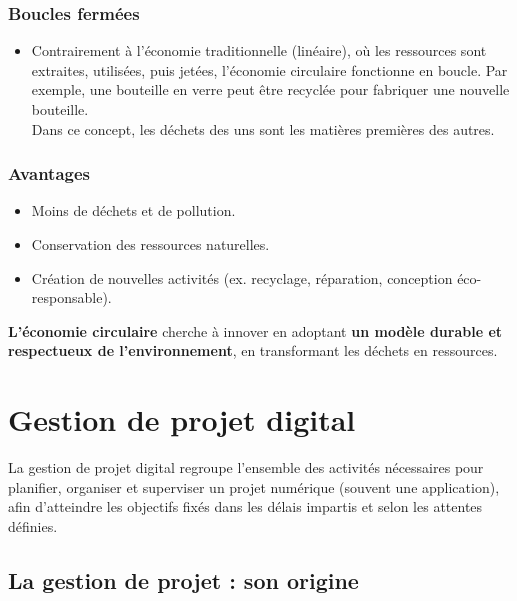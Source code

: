 \documentclass[
  letterpaper,
  DIV=11,
  numbers=noendperiod]{scrartcl}
\providecommand{\tightlist}{%
  \setlength{\itemsep}{0pt}\setlength{\parskip}{0pt}}\usepackage{longtable,booktabs,array}
\begin{document}
\subsubsection{Boucles fermées}\label{boucles-fermuxe9es}

\begin{itemize}
\tightlist
\item
  Contrairement à l'économie traditionnelle (linéaire), où les
  ressources sont extraites, utilisées, puis jetées, l'économie
  circulaire fonctionne en boucle. Par exemple, une bouteille en verre
  peut être recyclée pour fabriquer une nouvelle bouteille.\\
  Dans ce concept, les déchets des uns sont les matières premières des
  autres.
\end{itemize}

\subsubsection{Avantages}\label{avantages}

\begin{itemize}
\tightlist
\item
  Moins de déchets et de pollution.
\item
  Conservation des ressources naturelles.
\item
  Création de nouvelles activités (ex. recyclage, réparation, conception
  éco-responsable).
\end{itemize}

\textbf{L'économie circulaire} cherche à innover en adoptant \textbf{un
modèle durable et respectueux de l'environnement}, en transformant les
déchets en ressources.

\section{Gestion de projet digital}\label{gestion-de-projet-digital}

La gestion de projet digital regroupe l'ensemble des activités
nécessaires pour planifier, organiser et superviser un projet numérique
(souvent une application), afin d'atteindre les objectifs fixés dans les
délais impartis et selon les attentes définies.

\subsection{La gestion de projet : son
origine}\label{la-gestion-de-projet-son-origine}
\end{document}
